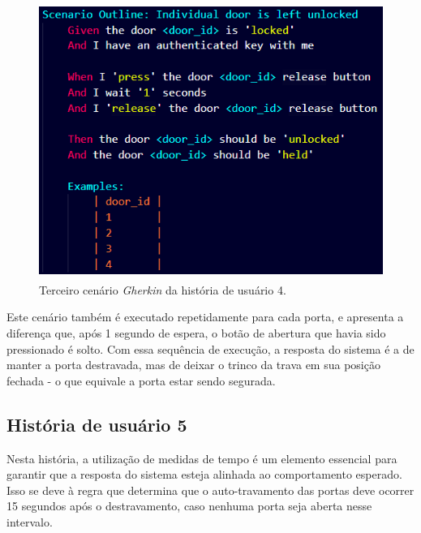 


\begin{figure}[H]
\centering
\includegraphics[height=9cm]{figuras/cenarios/h4c3.png}
\caption{Terceiro cenário \textit{Gherkin} da história de usuário 4.}
\label{fig:h4c3}
\end{figure}

Este cenário também é executado repetidamente para cada porta, e apresenta a diferença que, após 1 segundo de espera, o botão de abertura que havia sido pressionado 
é solto. Com essa sequência de execução, a resposta do sistema é a de manter a porta destravada, mas de deixar o trinco da trava em sua posição fechada - o que equivale 
a porta estar sendo segurada.


\subsection{História de usuário 5}

Nesta história, a utilização de medidas de tempo é um elemento essencial para garantir que a resposta do sistema esteja alinhada ao comportamento esperado. Isso 
se deve à regra que determina que o auto-travamento das portas deve ocorrer 15 segundos após o destravamento, caso nenhuma porta seja aberta nesse intervalo.

